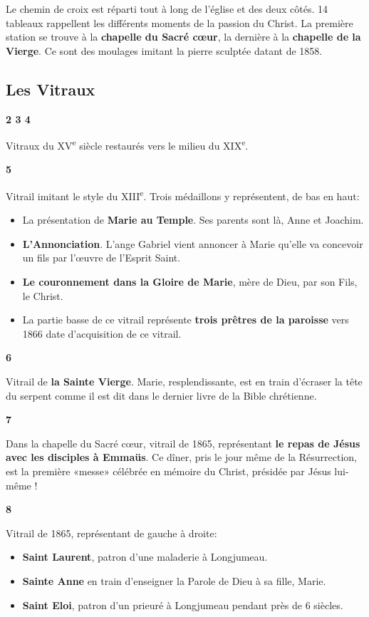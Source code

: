 \documentclass[a5paper, 9pt]{extarticle}
\newcommand{\linednote}[2]{
  \noindent
  \parbox[t]{0.9cm}{\small \textbf{#1}}%
  \parbox[t]{\dimexpr\linewidth-0.9cm}{\normalsize #2 \vspace{0.4em}}
  \newline
}
\begin{document}
Le chemin de croix est réparti tout à long de l'église et des deux
côtés. 14 tableaux rappellent les différents moments de la passion du
Christ. La première station se trouve à la \textbf{chapelle du Sacré
 cœur}, la dernière à la \textbf{chapelle de la Vierge}. Ce sont des
moulages imitant la pierre sculptée datant de 1858.

\subsection*{Les Vitraux}

\linednote{2 3 4}{Vitraux du \textsc{XV}\textsuperscript{e} siècle
restaurés vers le milieu du \textsc{XIX}\textsuperscript{e}.}
\linednote{5}{Vitrail imitant le style du
\textsc{XIII}\textsuperscript{e}. Trois médaillons y représentent, de
bas en haut:
\begin{itemize}[noitemsep,label=\textbullet]
  \item La présentation de \textbf{Marie au Temple}. Ses parents sont
    là, Anne et Joachim.
  \item \textbf{L'Annonciation}. L'ange Gabriel vient annoncer à Marie
    qu'elle va concevoir un fils par l'œuvre de l'Esprit Saint.
  \item \textbf{Le couronnement dans la Gloire de Marie}, mère de
    Dieu, par son Fils, le Christ.
  \item La partie basse de ce vitrail représente \textbf{trois prêtres
    de la paroisse} vers 1866 date d'acquisition de ce vitrail.
\end{itemize}}
\linednote{6}{Vitrail de \textbf{la Sainte Vierge}. Marie, resplendissante, est
en train d'écraser la tête du serpent comme il est dit dans le dernier
livre de la Bible chrétienne.}
\linednote{7}{Dans la chapelle du Sacré cœur, vitrail de 1865,
  représentant \textbf{le repas de Jésus avec les disciples à Emmaüs}.
  Ce dîner, pris le jour même de la Résurrection, est la première
  «messe» célébrée en mémoire du Christ, présidée par Jésus lui-même !}
\linednote{8}{Vitrail de 1865, représentant de gauche à droite:
\begin{itemize}[noitemsep,label=\textbullet]
  \item \textbf{Saint Laurent}, patron d'une maladerie à Longjumeau.
  \item \textbf{Sainte Anne} en train d'enseigner la Parole de Dieu à
    sa fille, Marie.
  \item \textbf{Saint Eloi}, patron d'un prieuré à Longjumeau pendant
    près de 6 siècles.
\end{itemize}}
\end{document}
